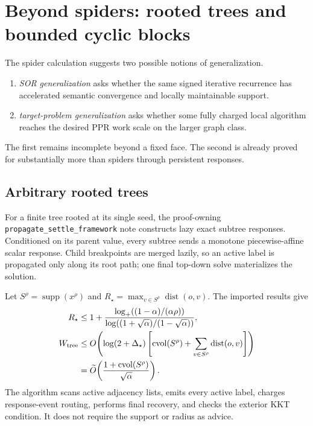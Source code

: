 \section{Beyond spiders: rooted trees and bounded cyclic blocks}
\label{sec:tree-and-block-results}

The spider calculation suggests two possible notions of generalization.

\begin{enumerate}[leftmargin=*]
\item \emph{SOR generalization} asks whether the same signed iterative
      recurrence has accelerated semantic convergence and locally maintainable
      support.
\item \emph{target-problem generalization} asks whether some fully charged
      local algorithm reaches the desired PPR work scale on the larger graph
      class.
\end{enumerate}

The first remains incomplete beyond a fixed face.  The second is already
proved for substantially more than spiders through persistent responses.

\subsection{Arbitrary rooted trees}

For a finite tree rooted at its single seed, the proof-owning
\texttt{propagate\_settle\_framework} note constructs lazy exact subtree
responses.  Conditioned on its parent value, every subtree sends a monotone
piecewise-affine scalar response.  Child breakpoints are merged lazily, so an
active label is propagated only along its root path; one final top-down solve
materializes the solution.

Let $S^\rho=\operatorname{supp}(x^\rho)$ and
$R_\star=\max_{v\in S^\rho}\operatorname{dist}(o,v)$.  The imported results
give
\begin{align}
 R_\star
 &\leq1+
 \frac{\log_+((1-\alpha)/(\alpha\rho))}
      {\log((1+\sqrt\alpha)/(1-\sqrt\alpha))},
 \label{eq:tree-support-radius-import}\\
 W_{\rm tree}
 &\leq O\!\left(
  \log(2+\Delta_\star)
  \left[
   \operatorname{cvol}(S^\rho)
   +\sum_{v\in S^\rho}\operatorname{dist}(o,v)
  \right]
 \right)
 \notag\\
 &=\widetilde O\!\left(
  \frac{1+\operatorname{cvol}(S^\rho)}{\sqrt\alpha}
 \right).
 \label{eq:tree-response-import}
\end{align}
The algorithm scans active adjacency lists, emits every active label, charges
response-event routing, performs final recovery, and checks the exterior KKT
condition.  It does not require the support or radius as advice.

